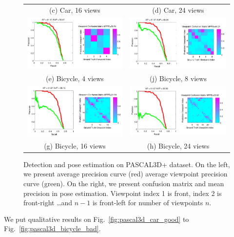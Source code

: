 \documentclass[10pt,twocolumn,letterpaper]{article}
\begin{document}
\begin{figure}[h]
\begin{tabular}{cc}
    (c) Car, 16 views&
    (d) Car, 24 views\\
  \includegraphics[width=0.45\linewidth]{supp/bicycle_cnn4_crop.png}&
  \includegraphics[width=0.45\linewidth]{supp/bicycle_cnn8_crop.png}\\
    (e) Bicycle, 4 views&
    (j) Bicycle, 8 views\\  
  \includegraphics[width=0.45\linewidth]{supp/bicycle_cnn16_crop.png}&
  \includegraphics[width=0.45\linewidth]{supp/bicycle_cnn24_crop.png}\\
    (g) Bicycle, 16 views&
    (h) Bicycle, 24 views\\
  \end{tabular}
  \caption{Detection and pose estimation on PASCAL3D+ dataset. On the left, we
  present average precision curve (red) average viewpoint precision curve
  (green). On the right, we present confusion matrix and mean precision in pose
  estimation. Viewpoint index 1 is front, index 2 is front-right \dots and
  $n-1$ is front-left for number of viewpoints $n$.}
  \label{fig:pascal_ap}
\end{figure}


We put qualitative results on Fig.~\ref{fig:pascal3d_car_good} to
Fig.~\ref{fig:pascal3d_bicycle_bad}. 
\end{document}
